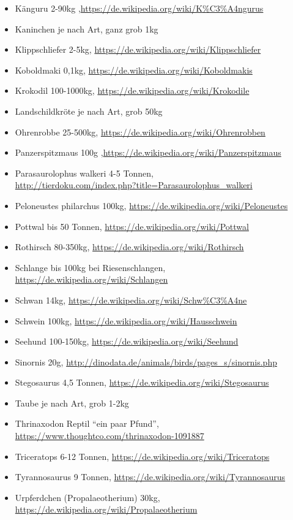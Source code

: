 \begin{itemize}
  \item Känguru 2-90kg ,\url{https://de.wikipedia.org/wiki/K\%C3\%A4ngurus}
  \item Kaninchen je nach Art, ganz grob 1kg
  \item Klippschliefer 2-5kg, \url{https://de.wikipedia.org/wiki/Klippschliefer}
  \item Koboldmaki 0,1kg, \url{https://de.wikipedia.org/wiki/Koboldmakis}
  \item Krokodil 100-1000kg, \url{https://de.wikipedia.org/wiki/Krokodile}
  \item Landschildkröte je nach Art, grob 50kg
  \item Ohrenrobbe 25-500kg, \url{https://de.wikipedia.org/wiki/Ohrenrobben}
  \item Panzerspitzmaus 100g ,\url{https://de.wikipedia.org/wiki/Panzerspitzmaus}
  \item Parasaurolophus walkeri 4-5 Tonnen,\\ \url{http://tierdoku.com/index.php?title=Parasaurolophus_walkeri}
  \item Peloneustes philarchus 100kg, \url{https://de.wikipedia.org/wiki/Peloneustes}
  \item Pottwal bis 50 Tonnen, \url{https://de.wikipedia.org/wiki/Pottwal}
  \item Rothirsch 80-350kg, \url{https://de.wikipedia.org/wiki/Rothirsch}
  \item Schlange bis 100kg bei Riesenschlangen, \url{https://de.wikipedia.org/wiki/Schlangen}
  \item Schwan 14kg, \url{https://de.wikipedia.org/wiki/Schw\%C3\%A4ne}
  \item Schwein 100kg, \url{https://de.wikipedia.org/wiki/Hausschwein}
  \item Seehund 100-150kg, \url{https://de.wikipedia.org/wiki/Seehund}
  \item Sinornis 20g, \url{http://dinodata.de/animals/birds/pages_s/sinornis.php}
  \item Stegosaurus 4,5 Tonnen, \url{https://de.wikipedia.org/wiki/Stegosaurus}
  \item Taube je nach Art, grob 1-2kg
  \item Thrinaxodon Reptil "`ein paar Pfund"', \url{https://www.thoughtco.com/thrinaxodon-1091887}
  \item Triceratops 6-12 Tonnen, \url{https://de.wikipedia.org/wiki/Triceratops}
  \item Tyrannosaurus 9 Tonnen, \url{https://de.wikipedia.org/wiki/Tyrannosaurus}
  \item Urpferdchen (Propalaeotherium) 30kg, \url{https://de.wikipedia.org/wiki/Propalaeotherium}
 \end{itemize}
 
